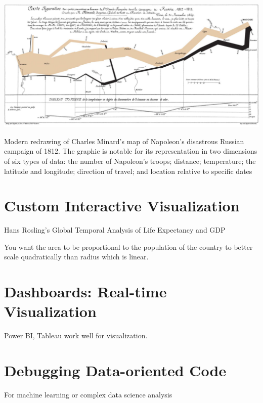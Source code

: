 \documentclass[11pt]{article}
\theoremstyle{definition}
\begin{document}
\includegraphics[width=\textwidth/2]{37.png}

Modern redrawing of Charles Minard's map of Napoleon's disastrous Russian campaign of
1812. The graphic is notable for its representation in two dimensions of six types of data: the
number of Napoleon's troops; distance; temperature; the latitude and longitude; direction of
travel; and location relative to specific dates

\section{Custom Interactive Visualization}
Hans Rosling's Global Temporal Analysis of Life Expectancy and GDP

You want the area to be proportional to the population of the country to better scale quadratically than radius which is linear. 

\section{Dashboards: Real-time Visualization}

Power BI, Tableau work well for visualization.

\section{Debugging
Data-oriented Code}
For machine learning or complex
data science analysis
\end{document}
